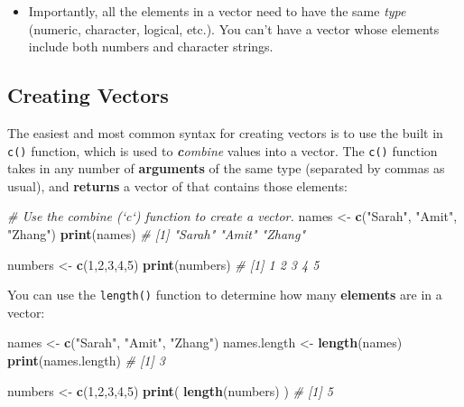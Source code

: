 \documentclass[]{book}
\newenvironment{Shaded}{\begin{snugshade}}{\end{snugshade}}
\newcommand{\KeywordTok}[1]{\textcolor[rgb]{0.13,0.29,0.53}{\textbf{#1}}}
\newcommand{\DecValTok}[1]{\textcolor[rgb]{0.00,0.00,0.81}{#1}}
\newcommand{\StringTok}[1]{\textcolor[rgb]{0.31,0.60,0.02}{#1}}
\newcommand{\CommentTok}[1]{\textcolor[rgb]{0.56,0.35,0.01}{\textit{#1}}}
\newcommand{\NormalTok}[1]{#1}
\providecommand{\tightlist}{%
  \setlength{\itemsep}{0pt}\setlength{\parskip}{0pt}}
\theoremstyle{definition}
\theoremstyle{definition}
\theoremstyle{remark}
\begin{document}
\begin{itemize}
\tightlist
\item
  Importantly, all the elements in a vector need to have the same
  \emph{type} (numeric, character, logical, etc.). You can't have a
  vector whose elements include both numbers and character strings.
\end{itemize}

\subsection{Creating Vectors}\label{creating-vectors}

The easiest and most common syntax for creating vectors is to use the
built in \texttt{c()} function, which is used to
\textbf{\emph{c}}\emph{ombine} values into a vector. The \texttt{c()}
function takes in any number of \textbf{arguments} of the same type
(separated by commas as usual), and \textbf{returns} a vector of that
contains those elements:

\begin{Shaded}
\begin{Highlighting}[]
\CommentTok{# Use the combine (`c`) function to create a vector.}
\NormalTok{names <-}\StringTok{ }\KeywordTok{c}\NormalTok{(}\StringTok{"Sarah"}\NormalTok{, }\StringTok{"Amit"}\NormalTok{, }\StringTok{"Zhang"}\NormalTok{)}
\KeywordTok{print}\NormalTok{(names)  }\CommentTok{# [1] "Sarah" "Amit"  "Zhang"}

\NormalTok{numbers <-}\StringTok{ }\KeywordTok{c}\NormalTok{(}\DecValTok{1}\NormalTok{,}\DecValTok{2}\NormalTok{,}\DecValTok{3}\NormalTok{,}\DecValTok{4}\NormalTok{,}\DecValTok{5}\NormalTok{)}
\KeywordTok{print}\NormalTok{(numbers)  }\CommentTok{# [1] 1 2 3 4 5}
\end{Highlighting}
\end{Shaded}

You can use the \texttt{length()} function to determine how many
\textbf{elements} are in a vector:

\begin{Shaded}
\begin{Highlighting}[]
\NormalTok{names <-}\StringTok{ }\KeywordTok{c}\NormalTok{(}\StringTok{"Sarah"}\NormalTok{, }\StringTok{"Amit"}\NormalTok{, }\StringTok{"Zhang"}\NormalTok{)}
\NormalTok{names.length <-}\StringTok{ }\KeywordTok{length}\NormalTok{(names)}
\KeywordTok{print}\NormalTok{(names.length)  }\CommentTok{# [1] 3}

\NormalTok{numbers <-}\StringTok{ }\KeywordTok{c}\NormalTok{(}\DecValTok{1}\NormalTok{,}\DecValTok{2}\NormalTok{,}\DecValTok{3}\NormalTok{,}\DecValTok{4}\NormalTok{,}\DecValTok{5}\NormalTok{)}
\KeywordTok{print}\NormalTok{( }\KeywordTok{length}\NormalTok{(numbers) )  }\CommentTok{# [1] 5}
\end{Highlighting}
\end{Shaded}
\end{document}
